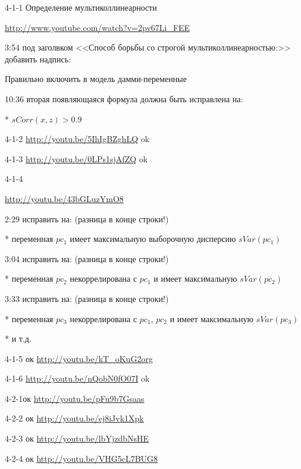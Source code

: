 \documentclass[12pt,a4paper]{article}
\begin{document}
4-1-1 Определение мультиколлинеарности

\url{http://www.youtube.com/watch?v=2pv67Li_FEE}

3:54 под заголвком <<Способ борьбы со строгой мультиколлинеарностью:>>  добавить надпись:

Правильно включить в модель дамми-переменные

10:36 вторая появляющаяся формула должна быть исправлена на:

* $sCorr(x,z)>0.9$    

4-1-2 \url{http://youtu.be/5IhIgBZghLQ} ok

4-1-3  \url{http://youtu.be/0LPs1sjAfZQ} ok

4-1-4

\url{http://youtu.be/43bGLuzYmO8}

2:29 исправить на: (разница в конце строки!)

* переменная $pc_1$ имеет максимальную выборочную дисперсию $sVar(pc_1)$

3:04 исправить на: (разница в конце строки!)

* переменная $pc_2$ некоррелирована с $pc_1$ и имеет максимальную $sVar(pc_2)$

3:33 исправить на: (разница в конце строки!)

* переменная $pc_3$ некоррелирована с $pc_1$, $pc_2$ и имеет максимальную $sVar(pc_3)$

* и т.д.

4-1-5 ок \url{http://youtu.be/kT_oKuG2org}

4-1-6  \url{http://youtu.be/nQobN0fO07I} ok

4-2-1ок \url{http://youtu.be/pFu9b7Gsaas}

4-2-2 ок \url{http://youtu.be/ej8iJvk1Xpk}

4-2-3 ок \url{http://youtu.be/lbYjzdbNsHE}

4-2-4 ок \url{http://youtu.be/VHG5cL7BUG8}
\end{document}
